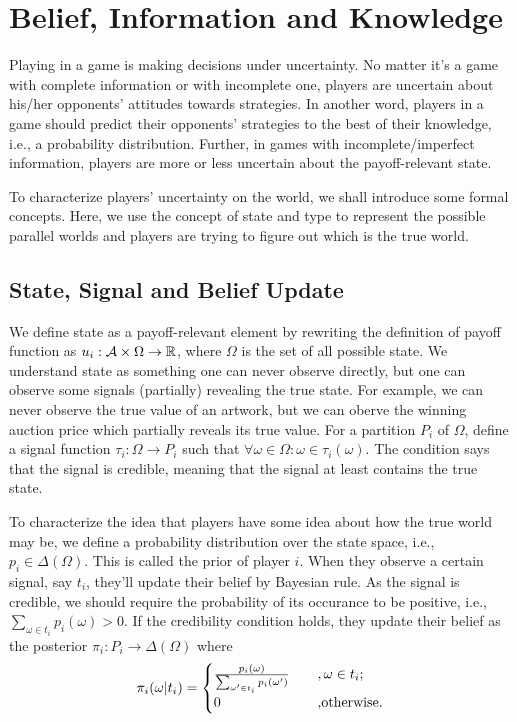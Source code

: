 \section{Belief, Information and Knowledge}
Playing in a game is making decisions under uncertainty. No matter it's a game with complete information or with incomplete one, players are uncertain about his/her opponents' attitudes towards strategies. 
In another word, players in a game should predict their opponents' strategies to the best of their knowledge, i.e., a probability distribution. Further, in games with incomplete/imperfect information, players are more or less uncertain about the payoff-relevant state.

To characterize players' uncertainty on the world, we shall introduce some formal concepts. Here, we use the concept of state and type to represent the possible parallel worlds and players are trying to figure out which is the true world.
\subsection{State, Signal and Belief Update}
We define state as a payoff-relevant element by rewriting the definition of payoff function as $u_i:\mathcal{A}\times \Omega\to \mathbb{R}$, where $\Omega$ is the set of all possible state. 
We understand state as something one can never observe directly, but one can observe some signals (partially) revealing the true state. For example, we can never observe the true value of an artwork, but we can oberve the winning auction price which partially reveals its true value.
For a partition $P_i$ of $\Omega$, define a signal function $\tau_i:\Omega\to P_i$ such that $\forall \omega\in \Omega: \omega\in\tau_i(\omega)$. 
The condition says that the signal is credible, meaning that the signal at least contains the true state.

To characterize the idea that players have some idea about how the true world may be, we define a probability distribution over the state space, i.e., $p_i\in \Delta(\Omega)$. This is called the prior of player $i$. 
When they observe a certain signal, say $t_i$, they'll update their belief by Bayesian rule. As the signal is credible, we should require the probability of its occurance to be positive, i.e., $\sum_{\omega\in t_i}p_i(\omega)>0$. If the credibility condition holds, they update their belief as the posterior $\pi_i: P_i\to \Delta(\Omega)$ where
$$
\pi_i(\omega|t_i)=\begin{cases}
     \frac{p_i(\omega)}{\sum_{\omega^{\prime}\in t_i}p_i(\omega^{\prime})} \quad&,\omega\in t_i;\\
    0 &\text{,otherwise.}
\end{cases}$$

